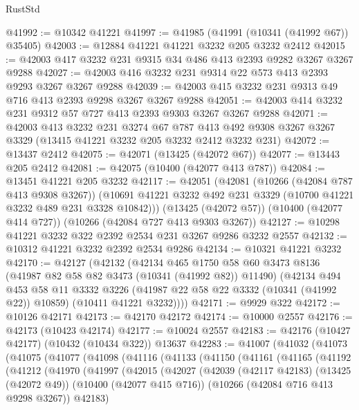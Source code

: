 \begin{lexlean}{RustStd}
\begin{coremodule}
@41992 := @10342 @41221
@41997 := @41985 (@41991 (@10341 (@41992 @67)) @35405)
@42003 := @12884 @41221 @41221 @3232 @205 @3232 @2412
@42015 := @42003 @417 @3232 @231 @9315 @34 @486 @413 @2393 @9282 @3267 @3267 @9288
@42027 := @42003 @416 @3232 @231 @9314 @22 @573 @413 @2393 @9293 @3267 @3267 @9288
@42039 := @42003 @415 @3232 @231 @9313 @49 @716 @413 @2393 @9298 @3267 @3267 @9288
@42051 := @42003 @414 @3232 @231 @9312 @57 @727 @413 @2393 @9303 @3267 @3267 @9288
@42071 := @42003
    @413
    @3232
    @231
    @3274
    @67
    @787
    @413
    @492
    @9308
    @3267
    @3267
    @3329
    (@13415 @41221 @3232 @205 @3232 @2412 @3232 @231)
@42072 := @13437 @2412
@42075 := @42071 (@13425 (@42072 @67))
@42077 := @13443 @205 @2412
@42081 := @42075 (@10400 (@42077 @413 @787))
@42084 := @13451 @41221 @205 @3232
@42117 := @42051
    (@42081
      (@10266 (@42084 @787 @413 @9308 @3267))
      (@10691 @41221 @3232 @492 @231 @3329 (@10700 @41221 @3232 @489 @231 @3328 @10842)))
    (@13425 (@42072 @57))
    (@10400 (@42077 @414 @727))
    (@10266 (@42084 @727 @413 @9303 @3267))
@42127 := @10298 @41221 @3232 @322 @2392 @2534 @231 @3267 @9286 @3232 @2557
@42132 := @10312 @41221 @3232 @2392 @2534 @9286
@42134 := @10321 @41221 @3232
@42170 := @42127
    (@42132
      (@42134
        @465
        @1750
        @58
        @60
        @3473
        @8136
        (@41987 @82 @58 @82 @3473 (@10341 (@41992 @82)) @11490)
        (@42134
          @494
          @453
          @58
          @11
          @3332
          @3226
          (@41987 @22 @58 @22 @3332 (@10341 (@41992 @22)) @10859)
          (@10411 @41221 @3232))))
@42171 := @9929 @322
@42172 := @10126 @42171
@42173 := @42170 @42172
@42174 := @10000 @2557
@42176 := @42173 (@10423 @42174)
@42177 := @10024 @2557
@42183 := @42176 (@10427 @42177) (@10432 (@10434 @322)) @13637
@42283 := @41007
    (@41032
      (@41073
        (@41075
          (@41077
            (@41098
              (@41116
                (@41133
                  (@41150
                    (@41161
                      (@41165
                        (@41192
                          (@41212
                            (@41970
                              (@41997
                                (@42015
                                  (@42027
                                    (@42039
                                      (@42117 @42183)
                                      (@13425 (@42072 @49))
                                      (@10400 (@42077 @415 @716))
                                      (@10266 (@42084 @716 @413 @9298 @3267))
                                      @42183)

\end{coremodule}
\end{lexlean}

